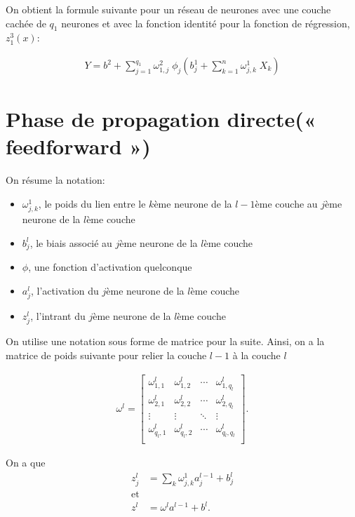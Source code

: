 On obtient la formule suivante pour un réseau de neurones avec une couche cachée de $q_1$ neurones et avec la fonction identité pour la fonction de régression, $z_1^3(x)$:  

\begin{align*}
Y=  b^2  + \sum_{j=1}^{q_1}  \omega_{1,j}^2  \; \phi_j \left(b_j^1 + \sum_{k=1}^n \omega_{j,k}^1 \; X_k \right)
\end{align*}


\section{Phase de propagation directe(« feedforward »)}
\label{sec:RN:feedforward}

On résume la notation:

\begin{itemize}
\item $ \omega_{j,k}^1$, le poids du lien entre le $k$ème neurone de la $l-1$ème couche au $j$ème neurone de la $l$ème couche
\item $b_j^l$, le biais associé au $j$ème neurone de la $l$ème couche
\item $\phi$, une fonction d'activation quelconque
\item $a_j^l$, l'activation du $j$ème neurone de la $l$ème couche
\item $z_j^l$, l'intrant du $j$ème neurone de la $l$ème couche
\end{itemize}

On utilise une notation sous forme de matrice pour la suite.
Ainsi, on a la matrice de poids suivante pour relier la couche $l-1$ à la couche $l$

\begin{align*}
\omega^l = 
\begin{bmatrix}
\omega^l_{1,1} &\omega^l_{1,2} & \cdots &\omega^l_{1,q_l}\\
\omega^l_{2,1} &\omega^l_{2,2} & \cdots &\omega^l_{2,q_l}\\
\vdots & \vdots &\ddots & \vdots \\
\omega^l_{q_l,1} &\omega^l_{q_l,2} & \cdots &\omega^l_{q_l,q_l}\\
\end{bmatrix}.
\end{align*}

On a que 
\begin{align*}
z_j^l&= \sum_k \omega_{j,k}^1 a_j^{l-1} + b_j^l\\
\text{et}\\
z^l&= \omega^l a^{l-1} + b^l.
\end{align*}

